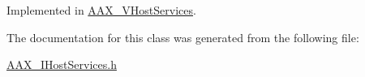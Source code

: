 Implemented in \mbox{\hyperlink{a01925_a4219edd9b129f3b3182b216cf1062985}{A\+A\+X\+\_\+\+V\+Host\+Services}}.



The documentation for this class was generated from the following file\+:\begin{DoxyCompactItemize}
\item 
\mbox{\hyperlink{a00611}{A\+A\+X\+\_\+\+I\+Host\+Services.\+h}}\end{DoxyCompactItemize}

